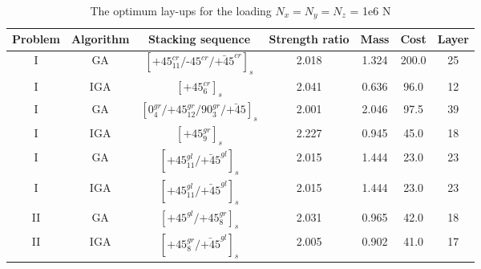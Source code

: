 \documentclass[USenglish]{article}
\begin{document}
\begin{table}
	\caption{The optimum lay-ups for the loading $N_x=N_y=N_z$ = 1e6 N} 
	\begin{tabular}{ccccccc}
	\toprule
	       Problem  &   Algorithm      & Stacking sequence                                    & Strength ratio  & Mass  &  Cost   & Layer    \\ 
	\midrule																								  
	   	  I  & GA   &  $[\text{+}45_{11}^{cr}/\text{-}45^{cr}/\bar{\text{+}45}^{cr}]_s$                            & 2.018           & 1.324 &  200.0  & 25  \\
	      I  & IGA  &  $[\text{+}45_{6}^{cr}]_s$                            & 2.041           & 0.636 &  96.0  & 12  \\
          I  & GA   &  $[0_4^{gr}/\text{+}45_{12}^{gr}/90_3^{gr}/\bar{\text{+}45}]_s$                            & 2.001           & 2.046 &  97.5  & 39  \\
		  I  & IGA  &  $[\text{+}45_{9}^{gr}]_s$                            & 2.227           & 0.945 &  45.0  & 18  \\
		  I  & GA   &  $[\text{+}45_{11}^{gl}/\bar{\text{+}45}^{gl}]_s$                            & 2.015           & 1.444 &  23.0  & 23  \\
		  I  & IGA  &   $[\text{+}45_{11}^{gl}/\bar{\text{+}45}^{gl}]_s$                           & 2.015           & 1.444 &  23.0  & 23  \\
		  II &  GA  &  $[\text{+}45^{gl}/\text{+}45_{8}^{gr}]_s$          & 2.031           & 0.965 &  42.0  & 18 \\
		  II & IGA  &  $[\text{+}45_8^{gr}/\bar{\text{+}45}^{gl}]_s$          & 2.005           & 0.902 &  41.0  & 17 \\
	\bottomrule
\end{tabular}
\label{tab:NxNyNz}
\end{table}
\end{document}
